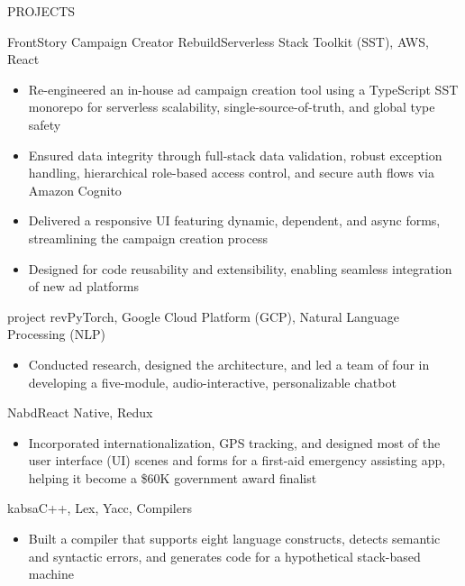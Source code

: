 \documentclass[]{mcdowellcv}
\begin{document}
	\begin{cvsection}{PROJECTS}
		\begin{cvsubsection}{FrontStory Campaign Creator Rebuild}{}{Serverless Stack Toolkit (SST), AWS, React}
			\begin{itemize}
				\item Re-engineered an in-house ad campaign creation tool using a TypeScript SST monorepo for serverless scalability, single-source-of-truth, and global type safety
				\item Ensured data integrity through full-stack data validation, robust exception handling, hierarchical role-based access control, and secure auth flows via Amazon Cognito
				\item Delivered a responsive UI featuring dynamic, dependent, and async forms, streamlining the campaign creation process
				\item Designed for code reusability and extensibility, enabling seamless integration of new ad platforms
			\end{itemize}
		\end{cvsubsection}
		\begin{cvsubsection}{project rev}{}{PyTorch, Google Cloud Platform (GCP), Natural Language Processing (NLP)}
			\begin{itemize}
				\item Conducted research, designed the architecture, and led a team of four in developing a five-module, audio-interactive, personalizable chatbot
			\end{itemize}
		\end{cvsubsection}
		\begin{cvsubsection}{Nabd}{}{React Native, Redux}
			\begin{itemize}
				\item Incorporated internationalization, GPS tracking, and designed most of the user interface (UI) scenes and forms for a first-aid emergency assisting app, helping it become a \$60K government award finalist
			\end{itemize}
		\end{cvsubsection}
		\begin{cvsubsection}{kabsa}{}{C++, Lex, Yacc, Compilers}
			\begin{itemize}
				\item Built a compiler that supports eight language constructs, detects semantic and syntactic errors, and generates code for a hypothetical stack-based machine
			\end{itemize}
		\end{cvsubsection}
	\end{cvsection}
\end{document}
